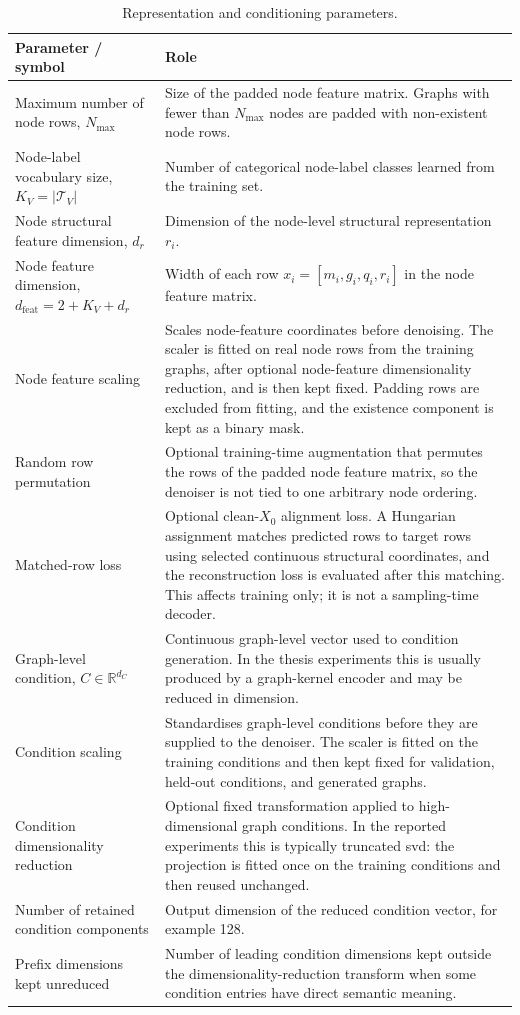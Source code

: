 \begin{table}[p]
\centering
\footnotesize
\begin{tabularx}{\textwidth}{@{}p{}X@{}}
\toprule
Parameter / symbol & Role \\
\midrule
Maximum number of node rows, \(N_{\max}\) & Size of the padded node feature matrix. Graphs with fewer than \(N_{\max}\) nodes are padded with non-existent node rows. \\
Node-label vocabulary size, \(K_V=|\mathcal{T}_V|\) & Number of categorical node-label classes learned from the training set. \\
Node structural feature dimension, \(d_r\) & Dimension of the node-level structural representation \(r_i\). \\
Node feature dimension, \(d_{\mathrm{feat}}=2+K_V+d_r\) & Width of each row \(x_i=[m_i,g_i,q_i,r_i]\) in the node feature matrix. \\
Node feature scaling & Scales node-feature coordinates before denoising. The scaler is fitted on real node rows from the training graphs, after optional node-feature dimensionality reduction, and is then kept fixed. Padding rows are excluded from fitting, and the existence component is kept as a binary mask. \\
Random row permutation & Optional training-time augmentation that permutes the rows of the padded node feature matrix, so the denoiser is not tied to one arbitrary node ordering. \\
Matched-row loss & Optional clean-\(X_0\) alignment loss. A Hungarian assignment matches predicted rows to target rows using selected continuous structural coordinates, and the reconstruction loss is evaluated after this matching. This affects training only; it is not a sampling-time decoder. \\
Graph-level condition, \(C\in\mathbb{R}^{d_C}\) & Continuous graph-level vector used to condition generation. In the thesis experiments this is usually produced by a graph-kernel encoder and may be reduced in dimension. \\
Condition scaling & Standardises graph-level conditions before they are supplied to the denoiser. The scaler is fitted on the training conditions and then kept fixed for validation, held-out conditions, and generated graphs. \\
Condition dimensionality reduction & Optional fixed transformation applied to high-dimensional graph conditions. In the reported experiments this is typically truncated \gls{svd}: the projection is fitted once on the training conditions and then reused unchanged. \\
Number of retained condition components & Output dimension of the reduced condition vector, for example 128. \\
Prefix dimensions kept unreduced & Number of leading condition dimensions kept outside the dimensionality-reduction transform when some condition entries have direct semantic meaning. \\
\bottomrule
\end{tabularx}
\caption{Representation and conditioning parameters.}
\label{tab:generator-representation-parameters}
\end{table}

